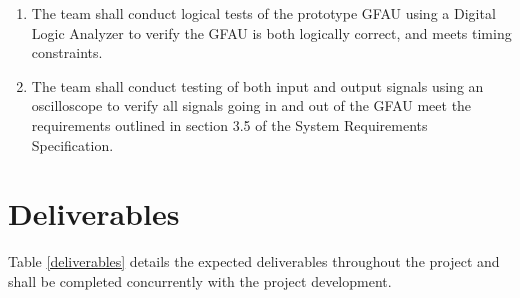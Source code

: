 \documentclass[12pt]{extarticle}
\begin{document}
            \begin{enumerate}
                \item The team shall conduct logical tests of the prototype GFAU
                using a Digital Logic Analyzer to verify the GFAU is both
                logically correct, and meets timing constraints.
                \item The team shall conduct testing of both input and output
                signals using an oscilloscope to verify all signals going in and
                out of the GFAU meet the requirements outlined in section 3.5 of
                the System Requirements Specification.
            \end{enumerate}

    \newpage
    \section{Deliverables} Table \ref{deliverables} details the expected
    deliverables throughout the project and shall be completed concurrently with
    the project development.
\end{document}
